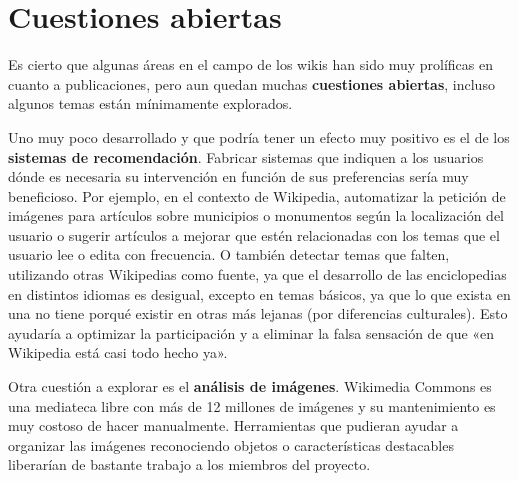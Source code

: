 \documentclass[11pt,onecolumn]{article}
\begin{document}
\section{Cuestiones abiertas}


Es cierto que algunas áreas en el campo de los wikis han sido muy prolíficas en cuanto a publicaciones, pero aun quedan muchas \textbf{cuestiones abiertas}, incluso algunos temas están mínimamente explorados.


Uno muy poco desarrollado y que podría tener un efecto muy positivo es el de los \textbf{sistemas de recomendación}. Fabricar sistemas que indiquen a los usuarios dónde es necesaria su intervención en función de sus preferencias sería muy beneficioso. Por ejemplo, en el contexto de Wikipedia, automatizar la petición de imágenes para artículos sobre municipios o monumentos según la localización del usuario o sugerir artículos a mejorar que estén relacionadas con los temas que el usuario lee o edita con frecuencia. O también detectar temas que falten, utilizando otras Wikipedias como fuente, ya que el desarrollo de las enciclopedias en distintos idiomas es desigual, excepto en temas básicos, ya que lo que exista en una no tiene porqué existir en otras más lejanas (por diferencias culturales). Esto ayudaría a optimizar la participación y a eliminar la falsa sensación de que «en Wikipedia está casi todo hecho ya».


Otra cuestión a explorar es el \textbf{análisis de imágenes}. Wikimedia Commons es una mediateca libre con más de 12 millones de imágenes y su mantenimiento es muy costoso de hacer manualmente. Herramientas que pudieran ayudar a organizar las imágenes reconociendo objetos o características destacables liberarían de bastante trabajo a los miembros del proyecto.

\end{document}
